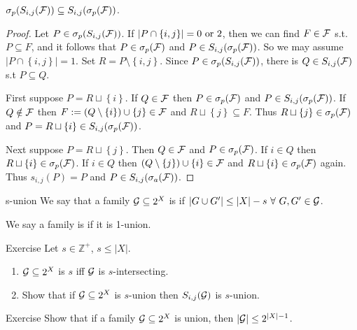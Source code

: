 \begin{proposition}{}
    $\sigma _p(\sij(\FF))\subseteq \sij(\sigma _{p}(\FF))$.
\end{proposition}

\begin{proof}
    Let $P\in \sigma _{p}(S_{i,j}(\mathcal{F}))$. If $\left|P\cap \left\{i,j\right\}\right|=0\textnormal{ or }2$, then we can find $F\in \mathcal{F}$ s.t. $P\subseteq F$, and it follows that $P\in \sigma _p(\mathcal{F})$ and $P\in S_{i,j}(\sigma _p(\mathcal{F}))$. So we may assume $\left|P\cap \left\{i,j\right\}\right|=1$. Set $R=P\setminus \left\{i,j\right\}$. Since $P\in \sigma _p(S_{i,j}(\mathcal{F}))$, there is $Q\in S_{i,j}(\mathcal{F})$ s.t $P\subseteq Q$.

    First suppose $P=R\sqcup\left\{i\right\}$. If $Q\in \mathcal{F}$ then $P\in \sigma _p(\mathcal{F})$ and $P\in S_{i,j}(\sigma _p(\mathcal{F}))$. If $Q\notin \mathcal{F}$ then $F:=(Q\setminus \left\{i\right\})\cup \left\{j\right\}\in \mathcal{F}$ and $R\sqcup\left\{j\right\}\subseteq F$. Thus $R\sqcup\left\{j\right\}\in \sigma _p(\mathcal{F})$ and $P=R\sqcup\left\{i\right\}\in S_{i,j}(\sigma _p(\mathcal{F}))$.

    Next suppose $P=R\sqcup\left\{j\right\}$. Then $Q\in \mathcal{F}$ and $P\in \sigma _p(\mathcal{F})$. If $i\in Q$ then $R\sqcup\left\{i\right\}\in \sigma _p(\mathcal{F})$. If $i\in Q$ then $(Q\setminus \left\{j\right\})\cup \left\{i\right\}\in \mathcal{F}$ and $R\sqcup\left\{i\right\}\in \sigma _p(\mathcal{F})$ again. Thus $s_{i,j}(P)=P$ and $P\in S_{i,j}(\sigma _a(\mathcal{F}))$.
\end{proof}

\begin{definition}[def:]{s-union}
    We say that a family $\mathcal{G}\subseteq 2^X$ is  if $\left|G\cup G'\right|\leq \left|X\right|-s\ \forall\ G,G'\in \GG$.

    We say a family is  if it is 1-union.
\end{definition}

\begin{newenv}[rnd:]{}{Exercise}
    Let $s\in \mathbb{Z}^+$, $s\leq |X|$.
    \begin{enumerate}
        \item $\mathcal{G}\subseteq 2^X$ is $s$ iff $\mathcal{G}$ is $s$-intersecting.
        \item Show that if $\mathcal{G}\subseteq 2^X$ is $s$-union then $\sij(\GG)$ is $s$-union.
    \end{enumerate}
\end{newenv}

\begin{newenv}[rnd:]{}{Exercise}
    Show that if a family $\mathcal{G}\subseteq 2^X$ is union, then $\left|\mathcal{G}\right|\leq 2^{\left|X\right|-1}$.
\end{newenv}

